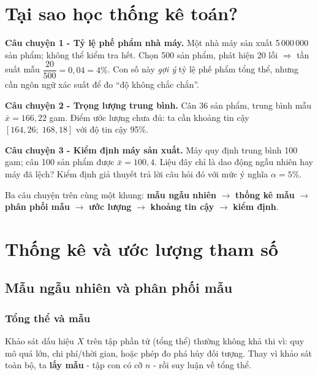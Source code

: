 \documentclass[12pt,a4paper]{article}
\begin{document}

\newpage
\tableofcontents
\newpage



\section*{Tại sao học thống kê toán?}

\begin{dongco}[title={Động cơ học - Ba tình huống quen thuộc}]
\textbf{Câu chuyện 1 - Tỷ lệ phế phẩm nhà máy.}
Một nhà máy sản xuất 5\,000\,000 sản phẩm; không thể kiểm tra hết. Chọn 500 sản phẩm, phát hiện 20 lỗi $\Rightarrow$ tần suất mẫu $\dfrac{20}{500} = 0{,}04 = 4\%$. Con số này \emph{gợi ý} tỷ lệ phế phẩm tổng thể, nhưng cần ngôn ngữ xác suất để đo ``độ không chắc chắn''.

\medskip
\textbf{Câu chuyện 2 - Trọng lượng trung bình.}
Cân 36 sản phẩm, trung bình mẫu $\bar{x} = 166{,}22$ gam. Điểm ước lượng chưa đủ: ta cần khoảng tin cậy $[164{,}26;\;168{,}18]$ với độ tin cậy 95\%.

\medskip
\textbf{Câu chuyện 3 - Kiểm định máy sản xuất.}
Máy quy định trung bình 100 gam; cân 100 sản phẩm được $\bar{x} = 100{,}4$. Liệu đây chỉ là dao động ngẫu nhiên hay máy đã lệch? Kiểm định giả thuyết trả lời câu hỏi đó với mức ý nghĩa $\alpha = 5\%$.

\medskip
Ba câu chuyện trên cùng một khung: \textbf{mẫu ngẫu nhiên} $\to$ \textbf{thống kê mẫu} $\to$ \textbf{phân phối mẫu} $\to$ \textbf{ước lượng} $\to$ \textbf{khoảng tin cậy} $\to$ \textbf{kiểm định}.
\end{dongco}

\newpage

\section{Thống kê và ước lượng tham số}
\subsection{Mẫu ngẫu nhiên và phân phối mẫu}

\subsubsection{Tổng thể và mẫu}

\begin{dongco}[title={Động cơ - Tại sao lấy mẫu?}]
Khảo sát dấu hiệu $X$ trên tập phần tử (tổng thể) thường không khả thi vì: quy mô quá lớn, chi phí/thời gian, hoặc phép đo phá hủy đối tượng. Thay vì khảo sát toàn bộ, ta \textbf{lấy mẫu} - tập con có cỡ $n$ - rồi suy luận về tổng thể.
\end{dongco}
\end{document}
